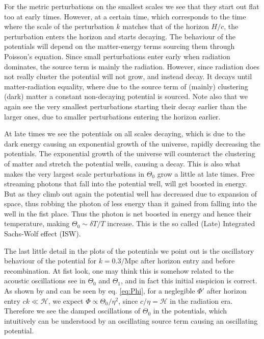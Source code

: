 \documentclass[twocolumn]{aastex62}
\begin{document}
For the metric perturbations on the smallest scales we see that they start out flat too at early times. However, at a certain time, which corresponds to the time where the scale of the perturbation $k$ matches that of the horizon $H/c$, the perturbation enters the horizon and starts decaying. The behaviour of the potentials will depend on the matter-energy terms sourcing them through Poisson's equation. Since small perturbations enter early when radiation dominates, the source term is mainly the radiation. However, since radiation does not really cluster the potential will not grow, and instead decay. It decays until matter-radiation equality, where due to the source term of (mainly) clustering (dark) matter a constant non-decaying potential is sourced. Note also that we again see the very smallest perturbations starting their decay earlier than the larger ones, due to smaller perturbations entering the horizon earlier. 

At late times we see the potentials on all scales decaying, which is due to the dark energy causing an exponential growth of the universe, rapidly decreasing the potentials. The exponential growth of the universe will counteract the clustering of matter and stretch the potential wells, causing a decay. This is also what makes the very largest scale perturbations in $\Theta_0$ grow a little at late times. Free streaming photons that fall into the potential well, will get boosted in energy. But as they climb out again the potential well has decreased due to expansion of space, thus robbing the photon of less energy than it gained from falling into the well in the fist place. Thus the photon is net boosted in energy and hence their temperature, making $\Theta_0\sim\delta T / T$ increase. This is the so called (Late) Integrated Sachs-Wolf effect (ISW).

The last little detail in the plots of the potentials we point out is the oscillatory behaviour of the potential for $k = 0.3/\mathrm{Mpc}$ after horizon entry and before recombination. At fist look, one may think this is somehow related to the acoustic oscillations see in $\Theta_0$ and $\Theta_1$, and in fact this initial suspicion is correct. As shown by \cite{dodelson:2003} and can be seen by eq. \ref{eq:Phi}, for a neglegible $\Phi'$ after horizon entry $ck \ll \mathcal{H}$, we expect $\Phi \propto \Theta_0 / \eta^2$, since $c/\eta = \mathcal{H}$ in the radiation era. Therefore we see the damped oscillations of $\Theta_0$ in the potentials, which intuitively can be understood by an oscillating source term causing an oscillating potential.
\end{document}
